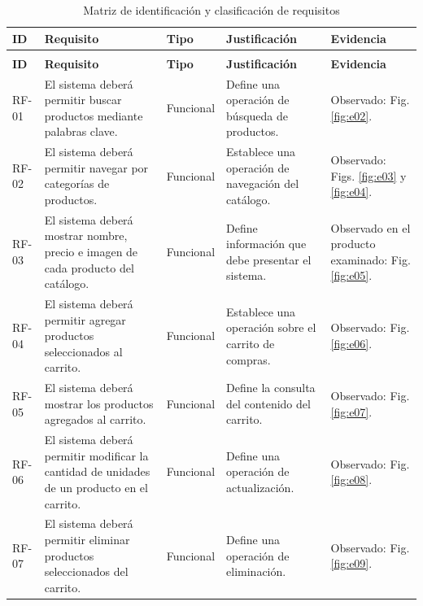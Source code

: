 \documentclass[12pt,a4paper]{article}
\begin{document}
\begin{longtable}{
|>{\raggedright\arraybackslash}p{1.25cm}|>{\raggedright\arraybackslash}p{4.6cm}|>{\raggedright\arraybackslash}p{1.85cm}|>{\raggedright\arraybackslash}p{4.2cm}|>{\raggedright\arraybackslash}p{2.6cm}|}
\caption{Matriz de identificación y clasificación de requisitos}
\label{tab:matriz_requisitos}\\
\hline
\textbf{ID} &
\textbf{Requisito} &
\textbf{Tipo} &
\textbf{Justificación} &
\textbf{Evidencia} \\
\hline
\endfirsthead

\multicolumn{5}{c}{\textit{Continuación de la matriz de requisitos}}\\
\hline
\textbf{ID} &
\textbf{Requisito} &
\textbf{Tipo} &
\textbf{Justificación} &
\textbf{Evidencia} \\
\hline
\endhead


RF-01 &
El sistema deberá permitir buscar productos mediante palabras clave. &
Funcional &
Define una operación de búsqueda de productos. &
Observado: Fig. \ref{fig:e02}. \\
\hline

RF-02 &
El sistema deberá permitir navegar por categorías de productos. &
Funcional &
Establece una operación de navegación del catálogo. &
Observado: Figs. \ref{fig:e03} y \ref{fig:e04}. \\
\hline

RF-03 &
El sistema deberá mostrar nombre, precio e imagen de cada producto del catálogo. &
Funcional &
Define información que debe presentar el sistema. &
Observado en el producto examinado: Fig. \ref{fig:e05}. \\
\hline

RF-04 &
El sistema deberá permitir agregar productos seleccionados al carrito. &
Funcional &
Establece una operación sobre el carrito de compras. &
Observado: Fig. \ref{fig:e06}. \\
\hline

RF-05 &
El sistema deberá mostrar los productos agregados al carrito. &
Funcional &
Define la consulta del contenido del carrito. &
Observado: Fig. \ref{fig:e07}. \\
\hline

RF-06 &
El sistema deberá permitir modificar la cantidad de unidades de un producto en el carrito. &
Funcional &
Define una operación de actualización. &
Observado: Fig. \ref{fig:e08}. \\
\hline

RF-07 &
El sistema deberá permitir eliminar productos seleccionados del carrito. &
Funcional &
Define una operación de eliminación. &
Observado: Fig. \ref{fig:e09}. \\
\hline


\end{longtable}
\end{document}
